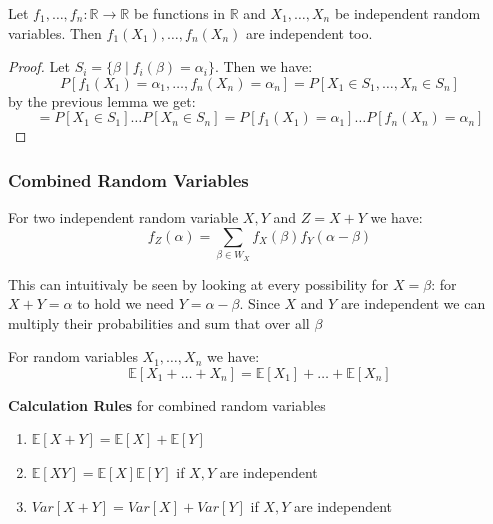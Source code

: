 \begin{theorem}
	Let $f_1, \dots, f_n: \mathbb{R} \to \mathbb{R}$ be functions in $\mathbb{R}$ and $X_1, \dots, X_n$ be independent random variables. Then $f_1(X_1), \dots, f_n(X_n)$ are independent too.
\end{theorem}

\begin{proof}
	Let $S_i = \{\beta \mid f_i(\beta) = \alpha_i\}$. Then we have:
	$$P[f_1(X_1) = \alpha_1, \dots, f_n(X_n) = \alpha_n] = P[X_1 \in S_1, \dots, X_n \in S_n]$$
	by the previous lemma we get:
	$$= P[X_1 \in S_1] \dots P[X_n \in S_n] = P[f_1(X_1) = \alpha_1] \dots P[f_n(X_n) = \alpha_n]$$
\end{proof}

\subsubsection{Combined Random Variables}

\begin{theorem}
	For two independent random variable $X, Y$ and $Z = X+Y$ we have:
	$$f_Z(\alpha) = \sum_{\beta \in W_X} f_X(\beta) f_Y(\alpha-\beta)$$
\end{theorem}

\begin{remark}
	This can intuitivaly be seen by looking at every possibility for $X = \beta$: for $X+Y = \alpha$ to hold we need $Y = \alpha - \beta$. Since $X$ and $Y$ are independent we can multiply their probabilities and sum that over all $\beta$
\end{remark}

\begin{theorem}
	For random variables $X_1, \dots , X_n$ we have:
	$$\mathbb{E}[X_1 + \dots + X_n] = \mathbb{E}[X_1] + \dots + \mathbb{E}[X_n]$$
\end{theorem}

\begin{remark}
	\textbf{Calculation Rules} for combined random variables
	\begin{enumerate}
		\item $\mathbb{E}[X+Y] = \mathbb{E}[X] + \mathbb{E}[Y]$
		\item $\mathbb{E}[XY] = \mathbb{E}[X] \mathbb{E}[Y]$ if $X, Y$ are independent
		\item $Var[X+Y] = Var[X] + Var[Y]$ if $X, Y$ are independent
	\end{enumerate}
\end{remark}

